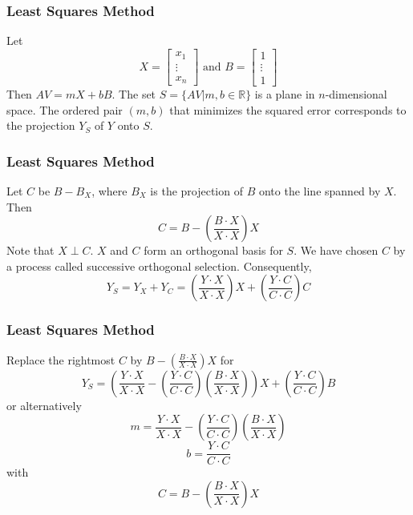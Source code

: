 \documentclass[xcolor=dvipsnames]{beamer}
\begin{document}
\begin{frame}
  \frametitle{Least Squares Method}
  Let
  \begin{equation}
    \label{eq:iapuveer}
    X=\left[
      \begin{array}{c}
        x_{1} \\
        {\vdots} \\
        x_{n}
      \end{array}\right]\mbox{ and }B=\left[
      \begin{array}{c}
        1 \\
        {\vdots} \\
        1
      \end{array}\right]
  \end{equation}
  Then $AV=mX+bB$. The set $S=\{AV|m,b\in\mathbb{R}\}$ is a plane in
  $n$-dimensional space. The ordered pair $(m,b)$ that minimizes the
  squared error corresponds to the projection $Y_{S}$ of $Y$ onto $S$.
\end{frame}

\begin{frame}
  \frametitle{Least Squares Method}
  Let $C$ be $B-B_{X}$, where $B_{X}$ is the projection of $B$ onto
  the line spanned by $X$. Then
  \begin{equation}
    \label{eq:aiwaozie}
    C=B-\left(\frac{B\cdot{}X}{X\cdot{}X}\right)X
  \end{equation}
  Note that $X\perp{}C$. $X$ and $C$ form an orthogonal basis for $S$.
  We have chosen $C$ by a process called \alert{successive orthogonal
    selection}. Consequently,
  \begin{equation}
    \label{eq:eijohkah}
    Y_{S}=Y_{X}+Y_{C}=\left(\frac{Y\cdot{}X}{X\cdot{}X}\right)X+\left(\frac{Y\cdot{}C}{C\cdot{}C}\right)C
  \end{equation}
\end{frame}

\begin{frame}
  \frametitle{Least Squares Method}
  Replace the rightmost $C$ by $B-\left(\frac{B\cdot{}X}{X\cdot{}X}\right)X$ for
  \begin{equation}
    \label{eq:maigeise}
    Y_{S}=\left(\frac{Y\cdot{}X}{X\cdot{}X}-\left(\frac{Y\cdot{}C}{C\cdot{}C}\right)\left(\frac{B\cdot{}X}{X\cdot{}X}\right)\right)X+\left(\frac{Y\cdot{}C}{C\cdot{}C}\right)B
  \end{equation}
  or alternatively
  \begin{equation}
    \label{eq:soguesee}
    m=\frac{Y\cdot{}X}{X\cdot{}X}-\left(\frac{Y\cdot{}C}{C\cdot{}C}\right)\left(\frac{B\cdot{}X}{X\cdot{}X}\right)
  \end{equation}
  \begin{equation}
    \label{eq:cuboonai}
    b=\frac{Y\cdot{}C}{C\cdot{}C}
  \end{equation}
  with
  \begin{equation}
    \label{eq:nesheeli}
    C=B-\left(\frac{B\cdot{}X}{X\cdot{}X}\right)X
  \end{equation}
\end{frame}
\end{document}
